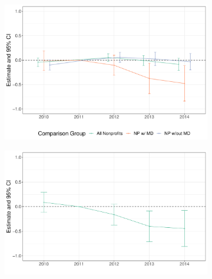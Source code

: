 \documentclass[12pt]{article}
\begin{document}
\begin{figure}[ht!]
     \caption{TWFE Event Study Results}
     \centering
          \begin{subfigure}[b]{0.45\textwidth}
         \centering
         \caption{}
         \includegraphics[width=\textwidth]{Objects/read_forprofit_es_graph.pdf}
         \label{fig:es_plota}
     \end{subfigure}%
     \hfill
     \begin{subfigure}[b]{0.45\textwidth}
         \centering
         \caption{}
         \includegraphics[width=\textwidth]{Objects/read_MD_es_graph.pdf}
         \label{fig:es_plotb}
     \end{subfigure}%
     \vspace{5mm}
     \hfill
     \begin{subfigure}[b]{0.45\textwidth}
         \centering
         \caption{}

\end{subfigure}
\end{figure}
\end{document}
